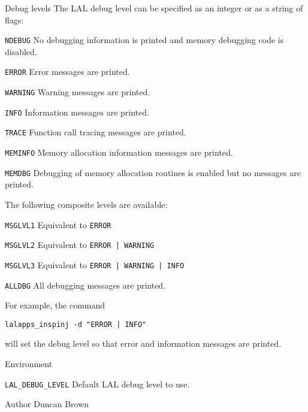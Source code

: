 \begin{entry}
\item[Debug levels]
The LAL debug level can be specified as an integer or as a string of flags:
\begin{entry}
\item[\texttt{NDEBUG}]
No debugging information is printed and memory debugging code is disabled.
\item[\texttt{ERROR}]
Error messages are printed.
\item[\texttt{WARNING}]
Warning messages are printed.
\item[\texttt{INFO}]
Information messages are printed.
\item[\texttt{TRACE}]
Function call tracing messages are printed.
\item[\texttt{MEMINFO}]
Memory  allocation  information messages are printed.
\item[\texttt{MEMDBG}]
Debugging of memory allocation routines is enabled but no messages are printed.
\end{entry}
The following composite levels are available:
\begin{entry}
\item[\texttt{MSGLVL1}]
Equivalent to \verb$ERROR$
\item[\texttt{MSGLVL2}]
Equivalent to \verb$ERROR | WARNING$
\item[\texttt{MSGLVL3}]
Equivalent to \verb$ERROR | WARNING | INFO$
\item[\texttt{ALLDBG}]
All debugging messages are printed.
\end{entry}

For example, the command
\begin{indented}
\verb$lalapps_inspinj -d "ERROR | INFO"$
\end{indented}
will set the debug level so that error and information messages are printed.

\item[Environment]\leavevmode

\begin{entry}
\item[\texttt{LAL\_DEBUG\_LEVEL}]
Default LAL debug level to use.
\end{entry}

\item[Author]
Duncan Brown

\end{entry}

